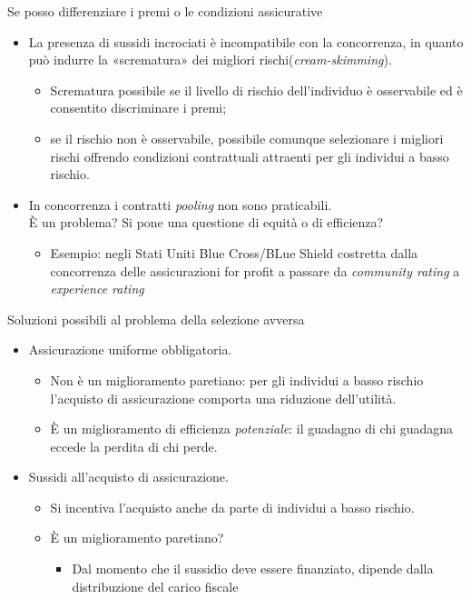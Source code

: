 \documentclass[aspectratio=64,12pt]{beamer}
\begin{document}
\begin{frame}{Se posso differenziare i premi o le condizioni assicurative}
\begin{itemize}
\item La presenza di sussidi incrociati è incompatibile con la concorrenza, in
  quanto può indurre la «scrematura» dei migliori
  rischi(\emph{cream-skimming}).
  \begin{itemize}
\item Scrematura possibile se il livello di rischio dell'individuo è
  osservabile ed è consentito discriminare i premi;
\item se il rischio non è osservabile, possibile comunque selezionare i
  migliori rischi offrendo condizioni contrattuali attraenti per gli individui
  a basso rischio.
\end{itemize}
\item In concorrenza i contratti \emph{pooling} non sono praticabili.\\
  È un problema? Si pone una questione di equità o di efficienza?
\begin{itemize}
\item Esempio: negli Stati Uniti Blue Cross/BLue Shield costretta dalla
concorrenza delle assicurazioni for profit a passare da \emph{community rating}
a \emph{experience rating}
\end{itemize}
\end{itemize}
\end{frame}

\begin{frame}{Soluzioni possibili al problema della selezione avversa}
\begin{itemize}
\item Assicurazione uniforme obbligatoria.

\begin{itemize}
\item Non è un miglioramento paretiano: per gli individui a basso
rischio l'acquisto di assicurazione comporta una riduzione dell'utilità.
\item È un miglioramento di efficienza \emph{potenziale}: il guadagno di chi guadagna
eccede la perdita di chi perde.
\end{itemize}

\item Sussidi all'acquisto di assicurazione.

\begin{itemize}
\item Si incentiva l'acquisto anche da parte di individui a basso rischio.
\item È un miglioramento paretiano?
\begin{itemize}
\item Dal momento che il sussidio deve essere finanziato, dipende dalla
distribuzione del carico fiscale
\end{itemize}
\end{itemize}
\end{itemize}
\end{frame}
\end{document}
